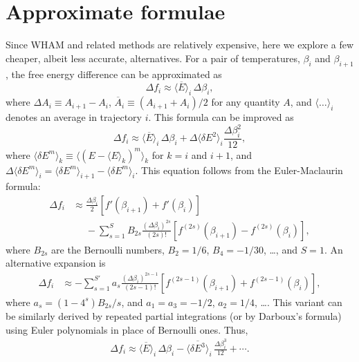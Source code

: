 \documentclass[reprint,aip,jcp,superscriptaddress]{revtex4-1}
\begin{document}
\section{\label{sec:approxf}
Approximate formulae}



Since WHAM and related methods
are relatively expensive,
here we explore a few cheaper,
albeit less accurate, alternatives.
%
For a pair of temperatures,
$\beta_i$ and $\beta_{i+1}$,
the free energy difference
can be approximated as\cite{park2007}
%
\begin{equation}
\Delta f_i
\approx
\overline{ \langle E \rangle }_i \, \Delta \beta_i,
\label{eq:df_eav}
\end{equation}
where
$\Delta A_i \equiv A_{i+1} - A_i$,
$\overline{ A }_i \equiv (A_{i+1} + A_i)/2$
for any quantity $A$,
and
$\langle\dots\rangle_i$
denotes an average in trajectory $i$.
%
This formula can be improved as
%
\begin{equation}
\Delta f_i
\approx
\overline{ \langle E \rangle }_i \, \Delta \beta_i
+
\Delta \langle \delta E^2 \rangle_i
\frac{ \Delta \beta_i^2 }{ 12 },
\label{eq:df_eavb}
\end{equation}
%
where
$\langle \delta E^m \rangle_k
\equiv \langle (E - \langle E \rangle_k)^m \rangle_k$
for $k = i$ and $i + 1$,
and
$\Delta \langle \delta E^m \rangle_i
= \langle \delta E^m \rangle_{i + 1}
- \langle \delta E^m \rangle_{i}$.
%
This equation follows from
the Euler-Maclaurin formula\cite{
arfken, whittaker, wang_specfunc, abramowitz}:
%
\begin{align*}
\Delta f_i
&\approx
\frac{\Delta \beta_i}{2}
\left[
  f'(\beta_{i+1}) + f'(\beta_i)
\right]
\\
&\phantom{=}
-
\sum_{s = 1}^{S}
  B_{2s}
  \frac{ (\Delta \beta_i)^{2s} } { (2 s)! }
  \left[
    f^{(2s)}(\beta_{i+1})
    -
    f^{(2s)}(\beta_i)
  \right],
\end{align*}
%
where $B_{2s}$ are the Bernoulli numbers,
$B_2 = 1/6$, $B_4 = -1/30$, \ldots,
and $S = 1$.
%
An alternative expansion is
%
\begin{align*}
\Delta f_i
&\approx
-\sum_{s = 1}^{S'}
  a_s
  \frac{ (\Delta \beta_i)^{2s - 1} } { (2 s - 1)! }
  \left[
    f^{(2s-1)}(\beta_{i+1})
    +
    f^{(2s-1)}(\beta_i)
  \right],
\end{align*}
where
$a_s = (1 - 4^s) B_{2s} /s$,
%
and
$a_1 = a_3 = -1/2$,
$a_2 = 1/4$,
\dots.
%
This variant can be similarly derived
by repeated partial integrations
(or by Darboux's formula\cite{
whittaker, wang_specfunc})
using Euler polynomials\cite{
wang_specfunc, abramowitz}
in place of Bernoulli ones.
%
Thus,
\begin{align}
\Delta f_i
\approx
\overline{ \langle E \rangle }_i \, \Delta \beta_i
-
\overline{ \langle \delta E^3 \rangle }_i
\, \frac{ \Delta \beta_i^3 } { 12 }
+ \cdots.
\label{eq:df_eavc}
\end{align}
%
\end{document}
